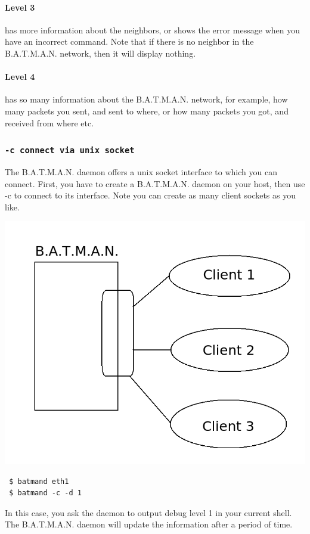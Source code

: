 \documentclass[
	12pt,
	a4paper,
	twoside,
	english,
	headsepline,
	footnosepline,
	automark,
	normalheadings,
	openany,
	cleardoubleplain,
	abstracton,
	idxtotoc,
	liststotoc,
	bibtotoc,
 	BCOR8mm,
]{scrartcl}
\newcommand{\subsubsectionttt}[1]{\subsubsection{\texttt{#1}}}
\begin{document}
\paragraph*{Level 3}
has more information about the neighbors, or shows the error message when  you  have an incorrect command. Note that if there is no neighbor in the B.A.T.M.A.N. network, then it  will display nothing.

\paragraph*{Level 4}
has so many information about the B.A.T.M.A.N. network, for example, how many packets  you sent, and sent to where, or how many packets you got, and received from where etc.

\subsubsectionttt{-c connect via unix socket}
The B.A.T.M.A.N. daemon offers a unix socket interface to which you can connect. First, you have to create a B.A.T.M.A.N. daemon on your host, then use  -c to connect to its  interface. Note you can create as many client sockets as you like.

\begin{center}
\includegraphics[scale=0.5]{multiple_clients}
\end{center}

\begin{verbatim}
 $ batmand eth1
 $ batmand -c -d 1
\end{verbatim}
 In this case, you ask the daemon to output debug level 1 in your current shell. The B.A.T.M.A.N. daemon will update the information after a period of time.
\end{document}
